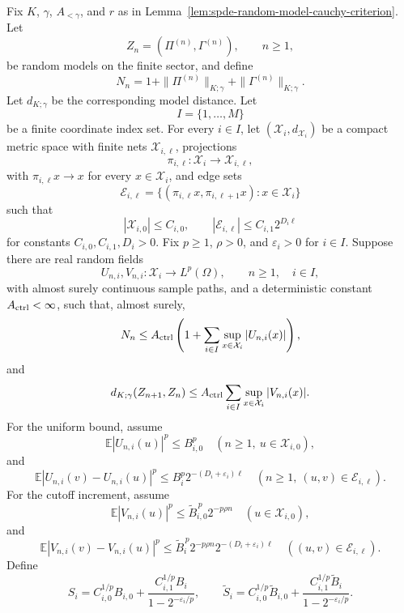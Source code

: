 \begin{hypothesis}
\label{hyp:spde-finite-sector-coordinate-control-data}
Fix \(K\), \(\gamma\), \(A_{<\gamma}\), and \(r\) as in
Lemma~\ref{lem:spde-random-model-cauchy-criterion}.  Let
\[
  Z_n=(\Pi^{(n)},\Gamma^{(n)}),\qquad n\geq1,
\]
be random models on the finite sector, and define
\[
  N_n=
  1+\|\Pi^{(n)}\|_{K;\gamma}+\|\Gamma^{(n)}\|_{K;\gamma}.
\]
Let \(d_{K;\gamma}\) be the corresponding model distance.  Let
\[
  I=\{1,\ldots,M\}
\]
be a finite coordinate index set.  For every \(i\in I\), let
\((\mathcal X_i,d_{\mathcal X_i})\) be a compact metric space with finite nets
\(\mathcal X_{i,\ell}\), projections
\[
  \pi_{i,\ell}:\mathcal X_i\to\mathcal X_{i,\ell},
\]
with \(\pi_{i,\ell}x\to x\) for every \(x\in\mathcal X_i\), and edge sets
\[
  \mathcal E_{i,\ell}
  =
  \{(\pi_{i,\ell}x,\pi_{i,\ell+1}x):x\in\mathcal X_i\}
\]
such that
\[
  |\mathcal X_{i,0}|\leq C_{i,0},\qquad
  |\mathcal E_{i,\ell}|\leq C_{i,1}2^{D_i\ell}
\]
for constants \(C_{i,0},C_{i,1},D_i>0\).
Fix \(p\geq1\), \(\rho>0\), and \(\varepsilon_i>0\) for \(i\in I\).
Suppose there are real random fields
\[
  U_{n,i},V_{n,i}:\mathcal X_i\to L^p(\Omega),
  \qquad n\geq1,\quad i\in I,
\]
with almost surely continuous sample paths, and a deterministic constant
\(A_{\rm ctrl}<\infty\), such that, almost surely,
\begin{equation}
  N_n
  \leq
  A_{\rm ctrl}
  \left(1+\sum_{i\in I}\sup_{x\in\mathcal X_i}|U_{n,i}(x)|\right),
  \label{eq:spde-coordinate-controls-model-norm}
\end{equation}
and
\begin{equation}
  d_{K;\gamma}(Z_{n+1},Z_n)
  \leq
  A_{\rm ctrl}
  \sum_{i\in I}\sup_{x\in\mathcal X_i}|V_{n,i}(x)|.
  \label{eq:spde-coordinate-controls-model-distance}
\end{equation}
For the uniform bound, assume
\[
  \mathbb E|U_{n,i}(u)|^p\leq B_{i,0}^p
  \quad(n\geq1,\ u\in\mathcal X_{i,0}),
\]
and
\[
  \mathbb E|U_{n,i}(v)-U_{n,i}(u)|^p
  \leq
  B_i^p2^{-(D_i+\varepsilon_i)\ell}
  \quad(n\geq1,\ (u,v)\in\mathcal E_{i,\ell}).
\]
For the cutoff increment, assume
\[
  \mathbb E|V_{n,i}(u)|^p
  \leq
  \widetilde B_{i,0}^{\,p}2^{-p\rho n}
  \quad(u\in\mathcal X_{i,0}),
\]
and
\[
  \mathbb E|V_{n,i}(v)-V_{n,i}(u)|^p
  \leq
  \widetilde B_i^{\,p}
  2^{-p\rho n}2^{-(D_i+\varepsilon_i)\ell}
  \quad((u,v)\in\mathcal E_{i,\ell}).
\]
Define
\[
  S_i=
  C_{i,0}^{1/p}B_{i,0}
  +
  \frac{C_{i,1}^{1/p}B_i}{1-2^{-\varepsilon_i/p}},
  \qquad
  \widetilde S_i=
  C_{i,0}^{1/p}\widetilde B_{i,0}
  +
  \frac{C_{i,1}^{1/p}\widetilde B_i}{1-2^{-\varepsilon_i/p}} .
\]
\end{hypothesis}

